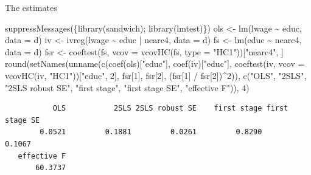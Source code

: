 \documentclass[
  11pt,
  ignorenonframetext,
  aspectratio=169,
]{beamer}
\newenvironment{Shaded}{\begin{snugshade}}{\end{snugshade}}
\newcommand{\AttributeTok}[1]{\textcolor[rgb]{0.40,0.45,0.13}{#1}}
\newcommand{\DecValTok}[1]{\textcolor[rgb]{0.68,0.00,0.00}{#1}}
\newcommand{\FunctionTok}[1]{\textcolor[rgb]{0.28,0.35,0.67}{#1}}
\newcommand{\NormalTok}[1]{\textcolor[rgb]{0.00,0.23,0.31}{#1}}
\newcommand{\OtherTok}[1]{\textcolor[rgb]{0.00,0.23,0.31}{#1}}
\newcommand{\SpecialCharTok}[1]{\textcolor[rgb]{0.37,0.37,0.37}{#1}}
\newcommand{\StringTok}[1]{\textcolor[rgb]{0.13,0.47,0.30}{#1}}
\begin{document}
\begin{frame}[fragile]{The estimates}
\protect{}\label{the-estimates}
\begin{Shaded}
\begin{Highlighting}[]
\FunctionTok{suppressMessages}\NormalTok{(\{}\FunctionTok{library}\NormalTok{(sandwich); }\FunctionTok{library}\NormalTok{(lmtest)\})}
\NormalTok{ols }\OtherTok{\textless{}{-}} \FunctionTok{lm}\NormalTok{(lwage }\SpecialCharTok{\textasciitilde{}}\NormalTok{ educ, }\AttributeTok{data =}\NormalTok{ d)}
\NormalTok{iv  }\OtherTok{\textless{}{-}} \FunctionTok{ivreg}\NormalTok{(lwage }\SpecialCharTok{\textasciitilde{}}\NormalTok{ educ }\SpecialCharTok{|}\NormalTok{ nearc4, }\AttributeTok{data =}\NormalTok{ d)}
\NormalTok{fs  }\OtherTok{\textless{}{-}} \FunctionTok{lm}\NormalTok{(educ }\SpecialCharTok{\textasciitilde{}}\NormalTok{ nearc4, }\AttributeTok{data =}\NormalTok{ d)}
\NormalTok{fsr }\OtherTok{\textless{}{-}} \FunctionTok{coeftest}\NormalTok{(fs, }\AttributeTok{vcov =} \FunctionTok{vcovHC}\NormalTok{(fs, }\AttributeTok{type =} \StringTok{"HC1"}\NormalTok{))[}\StringTok{"nearc4"}\NormalTok{, ]}
\FunctionTok{round}\NormalTok{(}\FunctionTok{setNames}\NormalTok{(}\FunctionTok{unname}\NormalTok{(}\FunctionTok{c}\NormalTok{(}\FunctionTok{coef}\NormalTok{(ols)[}\StringTok{"educ"}\NormalTok{], }\FunctionTok{coef}\NormalTok{(iv)[}\StringTok{"educ"}\NormalTok{],}
                        \FunctionTok{coeftest}\NormalTok{(iv, }\AttributeTok{vcov =} \FunctionTok{vcovHC}\NormalTok{(iv, }\StringTok{"HC1"}\NormalTok{))[}\StringTok{"educ"}\NormalTok{, }\DecValTok{2}\NormalTok{],}
\NormalTok{                        fsr[}\DecValTok{1}\NormalTok{], fsr[}\DecValTok{2}\NormalTok{], (fsr[}\DecValTok{1}\NormalTok{] }\SpecialCharTok{/}\NormalTok{ fsr[}\DecValTok{2}\NormalTok{])}\SpecialCharTok{\^{}}\DecValTok{2}\NormalTok{)),}
               \FunctionTok{c}\NormalTok{(}\StringTok{"OLS"}\NormalTok{, }\StringTok{"2SLS"}\NormalTok{, }\StringTok{"2SLS robust SE"}\NormalTok{,}
                 \StringTok{"first stage"}\NormalTok{, }\StringTok{"first stage SE"}\NormalTok{, }\StringTok{"effective F"}\NormalTok{)), }\DecValTok{4}\NormalTok{)}
\end{Highlighting}
\end{Shaded}

\begin{verbatim}
           OLS           2SLS 2SLS robust SE    first stage first stage SE 
        0.0521         0.1881         0.0261         0.8290         0.1067 
   effective F 
       60.3737 
\end{verbatim}


\end{frame}
\end{document}
